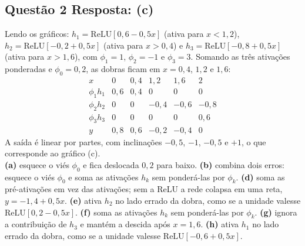 \documentclass[11pt,a4paper]{article}
\begin{document}
\subsection*{Questão 2 \textemdash{} Resposta: (c)}
Lendo os gráficos: $h_1 = \mathrm{ReLU}[0{,}6 - 0{,}5x]$ (ativa para $x < 1{,}2$), $h_2 = \mathrm{ReLU}[-0{,}2 + 0{,}5x]$ (ativa para $x > 0{,}4$) e $h_3 = \mathrm{ReLU}[-0{,}8 + 0{,}5x]$ (ativa para $x > 1{,}6$), com $\phi_1 = 1$, $\phi_2 = -1$ e $\phi_3 = 3$. Somando as três ativações ponderadas e $\phi_0 = 0{,}2$, as dobras ficam em $x = 0{,}4$, $1{,}2$ e $1{,}6$:
\[
\begin{array}{c|ccccc}
x & 0 & 0{,}4 & 1{,}2 & 1{,}6 & 2 \\\hline
\phi_1 h_1 & 0{,}6 & 0{,}4 & 0 & 0 & 0 \\
\phi_2 h_2 & 0 & 0 & -0{,}4 & -0{,}6 & -0{,}8 \\
\phi_3 h_3 & 0 & 0 & 0 & 0 & 0{,}6 \\\hline
y & 0{,}8 & 0{,}6 & -0{,}2 & -0{,}4 & 0
\end{array}
\]
A saída é linear por partes, com inclinações $-0{,}5$, $-1$, $-0{,}5$ e $+1$, o que corresponde ao gráfico (c).\\
\textbf{(a)} esquece o viés $\phi_0$ e fica deslocada $0{,}2$ para baixo.
\textbf{(b)} combina dois erros: esquece o viés $\phi_0$ e soma as ativações $h_k$ sem ponderá-las por $\phi_k$.
\textbf{(d)} soma as pré-ativações em vez das ativações; sem a ReLU a rede colapsa em uma reta, $y = -1{,}4 + 0{,}5x$.
\textbf{(e)} ativa $h_2$ no lado errado da dobra, como se a unidade valesse $\mathrm{ReLU}[0{,}2 - 0{,}5x]$.
\textbf{(f)} soma as ativações $h_k$ sem ponderá-las por $\phi_k$.
\textbf{(g)} ignora a contribuição de $h_3$ e mantém a descida após $x = 1{,}6$.
\textbf{(h)} ativa $h_1$ no lado errado da dobra, como se a unidade valesse $\mathrm{ReLU}[-0{,}6 + 0{,}5x]$.
\end{document}
